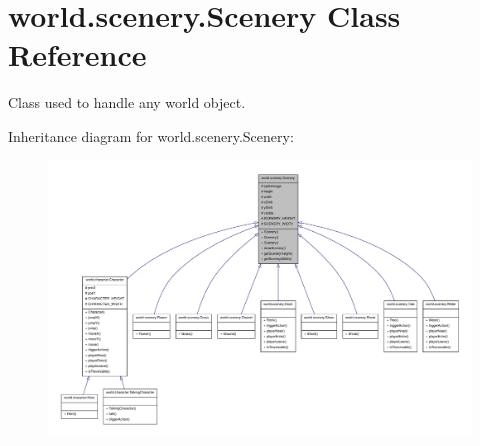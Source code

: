 \hypertarget{classworld_1_1scenery_1_1_scenery}{\section{world.\-scenery.\-Scenery Class Reference}
\label{classworld_1_1scenery_1_1_scenery}
}


Class used to handle any world object.  




Inheritance diagram for world.\-scenery.\-Scenery\-:\nopagebreak
\begin{figure}[H]
\begin{center}
\leavevmode
\includegraphics[width=350pt]{classworld_1_1scenery_1_1_scenery__inherit__graph}
\end{center}
\end{figure}


